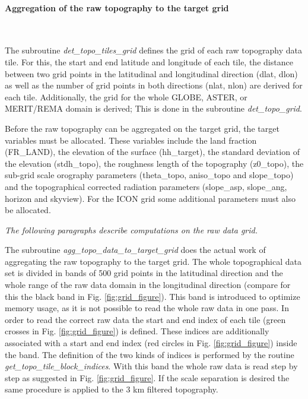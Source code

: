 \documentclass[a4paper,10pt,DIV14,BCOR1cm,titlepage,twoside]{scrartcl}
\begin{document}
\paragraph{Aggregation of the raw topography to the target grid}\ \par\medskip\noindent
The subroutine \textit{det\_topo\_tiles\_grid} defines the grid of each raw topography data tile. For this, the start and end latitude and longitude of each tile, the distance between two grid points in the latitudinal and longitudinal direction (dlat, dlon) as well as the number of grid points in both directions (nlat, nlon) are derived for each tile. Additionally, the grid for the whole GLOBE, ASTER, or MERIT/REMA domain is derived; This is done in the subroutine \textit{det\_topo\_grid}.\par\medskip\noindent
Before the raw topography can be aggregated on the target grid, the target variables must be allocated. These variables include the land fraction (FR\_LAND), the elevation of the surface (hh\_target), the standard deviation of the elevation (stdh\_topo), the roughness length of the topography (z0\_topo), the sub-grid scale orography parameters (theta\_topo, aniso\_topo and slope\_topo) and the topographical corrected radiation parameters (slope\_asp, slope\_ang, horizon and skyview). For the ICON grid some additional parameters must also be allocated.\par\medskip\noindent
\textit{The following paragraphs describe computations on the raw data grid.}\par\medskip\noindent
The subroutine \textit{agg\_topo\_data\_to\_target\_grid} does the actual work of aggregating the raw topography to the target grid. The whole topographical data set is divided in bands of 500 grid points in the latitudinal direction and the whole range of the raw data domain in the longitudinal direction (compare for this the black band in Fig. \ref{fig:grid_figure}). This band is introduced to optimize memory usage, as it is not possible to read the whole raw data in one pass. In order to read the correct raw data the start and end index of each tile (green crosses in Fig. \ref{fig:grid_figure}) is defined. These indices are additionally associated with a start and end index (red circles in Fig. \ref{fig:grid_figure}) inside the band. The definition of the two kinds of indices is performed by the routine \textit{get\_topo\_tile\_block\_indices}. With this band the whole raw data is read step by step as suggested in Fig. \ref{fig:grid_figure}. If the scale separation is desired the same procedure is applied to the 3 km filtered topography.\par\medskip\noindent
\end{document}
